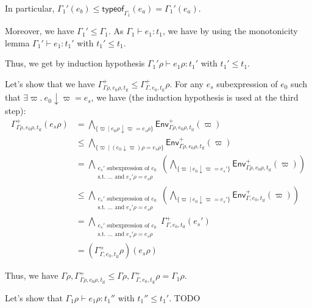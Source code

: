 \documentclass[a4paper]{article}%
\newcommand{\alt}{~|~}
\newcommand{\tyof}[2]{\textsf{typeof}_{#2}(#1)}
\newcommand{\Gp}[2]{\textsf{Env}^{#1}_{#2}}
\theoremstyle{definition}
\begin{document}
\begin{description}
\begin{itemize}
            In particular, $\Gamma_1'(e_b)\leq \tyof {e_a} {\Gamma_1} = \Gamma_1'(e_a)$.
            
            Moreover, we have $\Gamma_1' \leq \Gamma_1$.
            As $\Gamma_1 \vdash e_1:t_1$, we have by using the monotonicity lemma $\Gamma_1' \vdash e_1:t_1'$ with $t_1'\leq t_1$.
    
            Thus, we get by induction hypothesis $\Gamma_1'\rho\vdash e_1\rho:t_1'$ with $t_1' \leq t_1$.
    
            Let's show that we have $\Gamma^+_{\Gamma\rho,e_0\rho,t_{\text{if}}} \leq \Gamma^+_{\Gamma,e_0,t_{\text{if}}}\rho$.
            For any $e_s$ subexpression of $e_0$ such that $\exists \varpi.\ e_0\downarrow\varpi=e_s$, we have (the induction hypothesis is used at the third step):
            \begin{align*}
              \Gamma^+_{\Gamma\rho,e_0\rho,t_{\text{if}}}(e_s\rho) &= \bigwedge_{\{\varpi\alt e_0\rho\downarrow\varpi=e_s\rho\}} \Gp + {\Gamma\rho,e_0\rho,t_{\text{if}}} (\varpi)\\
              &\leq \bigwedge_{\{\varpi\alt (e_0\downarrow\varpi)\rho=e_s\rho\}} \Gp + {\Gamma\rho,e_0\rho,t_{\text{if}}} (\varpi)\\
              &= \bigwedge_{\substack{e_s' \text{ subexpression of } e_0\\\text{s.t. } \dots \text{ and } e_s'\rho=e_s\rho}} \left(\bigwedge_{\{\varpi\alt e_0\downarrow\varpi=e_s'\}} \Gp + {\Gamma\rho,e_0\rho,t_{\text{if}}} (\varpi)\right)\\
              &\leq \bigwedge_{\substack{e_s' \text{ subexpression of } e_0\\\text{s.t. } \dots \text{ and } e_s'\rho=e_s\rho}} \left(\bigwedge_{\{\varpi\alt e_0\downarrow\varpi=e_s'\}} \Gp + {\Gamma,e_0,t_{\text{if}}} (\varpi)\right)\\
              &= \bigwedge_{\substack{e_s' \text{ subexpression of } e_0\\\text{s.t. } \dots \text{ and } e_s'\rho=e_s\rho}} \Gamma^+_{\Gamma,e_0,t_{\text{if}}} (e_s')\\
              &= (\Gamma^+_{\Gamma,e_0,t_{\text{if}}}\rho)(e_s\rho)
            \end{align*}
    
            Thus, we have $\Gamma\rho, \Gamma^+_{\Gamma\rho,e_0\rho,t_{\text{if}}} \leq \Gamma\rho,\Gamma^+_{\Gamma,e_0,t_{\text{if}}}\rho = \Gamma_1\rho$.
    
            Let's show that $\Gamma_1\rho \vdash e_1\rho:t_1''$ with $t_1''\leq t_1'$.
            TODO
    

\end{itemize}
\end{description}
\end{document}
